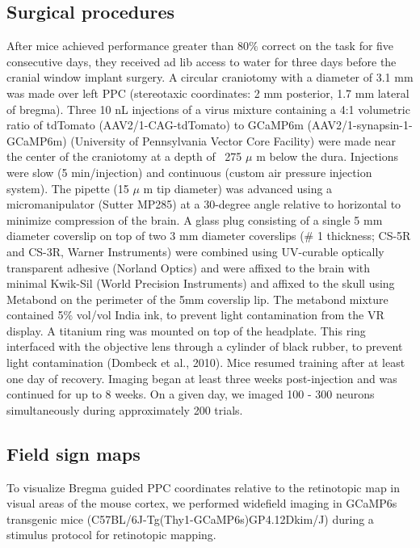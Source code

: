 \subsection{Surgical procedures}
After mice achieved performance greater than 80$\%$ correct on the task for five consecutive days, they received ad lib access to water for three days before the cranial window implant surgery. A circular craniotomy with a diameter of 3.1 mm was made over left PPC (stereotaxic coordinates: 2 mm posterior, 1.7 mm lateral of bregma). Three 10 nL injections of a virus mixture containing a 4:1 volumetric ratio of tdTomato (AAV2/1-CAG-tdTomato) to GCaMP6m (AAV2/1-synapsin-1-GCaMP6m) (University of Pennsylvania Vector Core Facility) were made near the center of the craniotomy at a depth of ~275 $\mu$ m below the dura. Injections were slow (5 min/injection) and continuous (custom air pressure injection system). The pipette (15 $\mu$ m tip diameter) was advanced using a micromanipulator (Sutter MP285) at a 30-degree angle relative to horizontal to minimize compression of the brain. A glass plug consisting of a single 5 mm diameter coverslip on top of two 3 mm diameter coverslips ($\#$ 1 thickness; CS-5R and CS-3R, Warner Instruments) were combined using UV-curable optically transparent adhesive (Norland Optics) and were affixed to the brain with minimal Kwik-Sil (World Precision Instruments) and affixed to the skull using Metabond on the perimeter of the 5mm coverslip lip. The metabond mixture contained 5$\%$ vol/vol India ink, to prevent light contamination from the VR display. A titanium ring was mounted on top of the headplate. This ring interfaced with the objective lens through a cylinder of black rubber, to prevent light contamination (Dombeck et al., 2010). Mice resumed training after at least one day of recovery. Imaging began at least three weeks post-injection and was continued for up to 8 weeks. On a given day, we imaged 100 - 300 neurons simultaneously during approximately 200 trials.

\subsection{Field sign maps}
To visualize Bregma guided PPC coordinates relative to the retinotopic map in visual areas of the mouse cortex, we performed widefield imaging in GCaMP6s transgenic mice (C57BL/6J-Tg(Thy1-GCaMP6s)GP4.12Dkim/J) during a stimulus protocol for retinotopic mapping.

